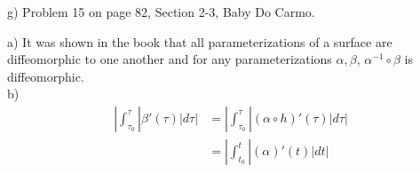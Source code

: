 \documentclass[10pt,letterpaper]{hmcpset}
\begin{document}
\newpage 
%

\begin{problem}
  g) Problem 15 on page 82, Section 2-3, Baby Do Carmo. \\

  
\end{problem}
\begin{solution}
  a) It was shown in the book that all parameterizations of a surface are
diffeomorphic to one another and for any parameterizations $\alpha, \beta$, $\alpha^{-1} \circ
\beta$ is diffeomorphic. \\
b) \\
\begin{align*}
  |\int_{\tau_0}^{\tau} |\beta'(\tau)| d\tau| &= |\int_{\tau_0}^{\tau} |(\alpha \circ h)'(\tau)| d\tau| \\
  &= |\int_{t_0}^t |(\alpha)'(t)| dt|
\end{align*}

\end{solution}
\end{document}
